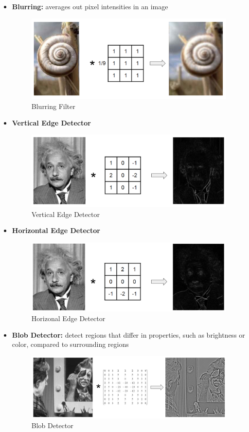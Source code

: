 \begin{itemize}
    \item \textbf{Blurring:} averages out pixel intensities in an image
    \begin{figure}[h!t]
        \centering
        \includegraphics[width=0.45\linewidth]{blurringkernel.png}
        \caption{Blurring Filter}
        \label{fig:enter-label}
    \end{figure}
    \item \textbf{Vertical Edge Detector}
\begin{figure}[h!t]
    \centering
    \includegraphics[width=0.45\linewidth]{verticaledgekernel.png}
    \caption{Vertical Edge Detector}
    \label{fig:enter-label}
\end{figure}
    \item \textbf{Horizontal Edge Detector}
\begin{figure}[h!t]
    \centering
    \includegraphics[width=0.45\linewidth]{horizontaledgekernel.png}
    \caption{Horizonal Edge Detector}
    \label{fig:enter-label}
\end{figure}
    \item \textbf{Blob Detector:} detect regions that differ in properties, such as brightness or color, compared to
surrounding regions
\begin{figure}[h!t]
    \centering
    \includegraphics[width=0.45\linewidth]{blobdetectorkernel.png}
    \caption{Blob Detector}
    \label{fig:enter-label}
\end{figure}
\end{itemize}

